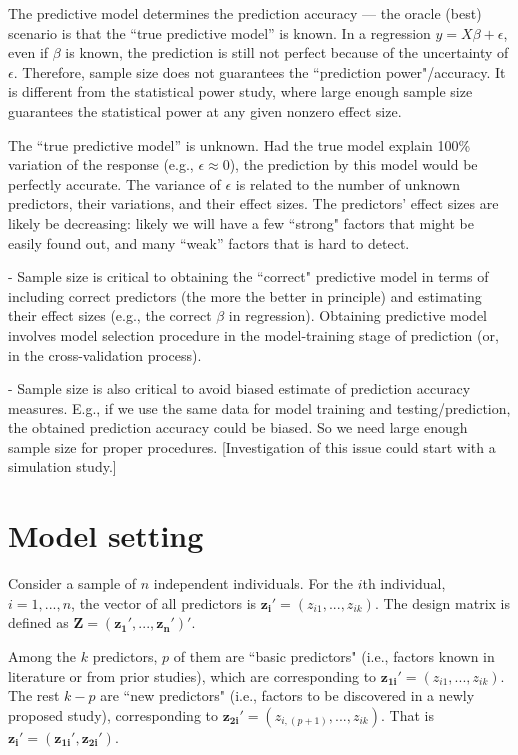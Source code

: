 \documentclass[11pt]{article}
\begin{document}
The predictive model determines the prediction accuracy — the oracle (best) scenario is that the “true predictive model” is known. In a regression $y=X\beta + \epsilon$, even if $\beta$ is known, the prediction is still not perfect because of the uncertainty of $\epsilon$. 
Therefore, sample size does not guarantees the ``prediction power"/accuracy. It is different from the statistical power study, where large enough sample size guarantees the statistical power at any given nonzero effect size.

The “true predictive model” is unknown. Had the true model explain 100\% variation of the response (e.g., $\epsilon \approx 0$), the prediction by this model would be perfectly accurate. The variance of $\epsilon$ is related to the number of unknown predictors, their variations, and their effect sizes. 
The predictors’ effect sizes are likely be decreasing: likely we will have a few ``strong" factors that might be easily found out, and many “weak” factors that is hard to detect.


- Sample size is critical to obtaining the ``correct" predictive model in terms of including correct predictors (the more the better in principle) and estimating their effect sizes (e.g., the correct $\beta$ in regression).%
Obtaining predictive model involves model selection procedure in the model-training stage of prediction (or, in the cross-validation process).

- Sample size is also critical to avoid biased estimate of prediction accuracy measures.  E.g., if we use the same data for model training and testing/prediction, the obtained prediction accuracy could be biased. So we need large enough sample size for proper procedures. [Investigation of this issue could start with a simulation study.]


\section{Model setting}%


Consider a sample of $n$ independent individuals. For the $i$th individual, $i = 1, ..., n$, the vector of all predictors is $\boldsymbol{z_i}' = (z_{i1},..., z_{ik})$.  The design matrix is defined as $\boldsymbol{Z} = (\boldsymbol{z_1}', ..., \boldsymbol{z_n}')'$. 

Among the $k$ predictors, $p$ of them are ``basic predictors" (i.e., factors known in literature or from prior studies), which are corresponding to $\boldsymbol{z_{1i}}' = (z_{i1},..., z_{ik})$. The rest $k-p$ are ``new predictors" (i.e., factors to be discovered in a newly proposed study), corresponding to  $\boldsymbol{z_{2i}}' = (z_{i,(p+1)},..., z_{ik})$. That is $\boldsymbol{z_i}' =(\boldsymbol{z_{1i}}', \boldsymbol{z_{2i}}')$. 
\end{document}

